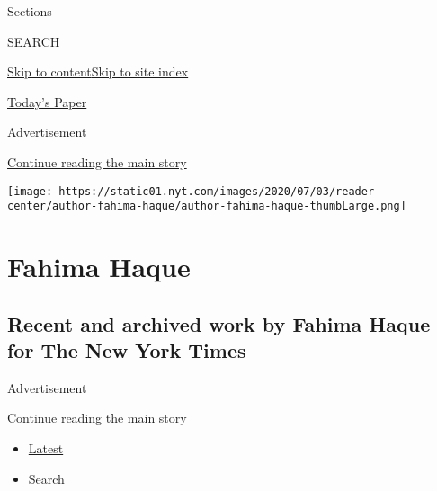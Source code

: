 Sections

SEARCH

\protect\hyperlink{site-content}{Skip to
content}\protect\hyperlink{site-index}{Skip to site index}

\href{https://myaccount.nytimes.com/auth/login?response_type=cookie\&client_id=vi}{}

\href{https://www.nytimes.com/section/todayspaper}{Today's Paper}

Advertisement

\protect\hyperlink{after-top}{Continue reading the main story}

\texttt{[image: https://static01.nyt.com/images/2020/07/03/reader-center/author-fahima-haque/author-fahima-haque-thumbLarge.png]}

\hypertarget{fahima-haque}{%
\section{Fahima Haque}\label{fahima-haque}}

\hypertarget{recent-and-archived-work-by-fahima-haque-for-the-new-york-times}{%
\subsection{Recent and archived work by Fahima Haque for The New York
Times}\label{recent-and-archived-work-by-fahima-haque-for-the-new-york-times}}

Advertisement

\protect\hyperlink{after-mid1}{Continue reading the main story}

\begin{itemize}
\tightlist
\item
  \protect\hyperlink{stream-panel}{Latest}
\item
  Search
\end{itemize}

